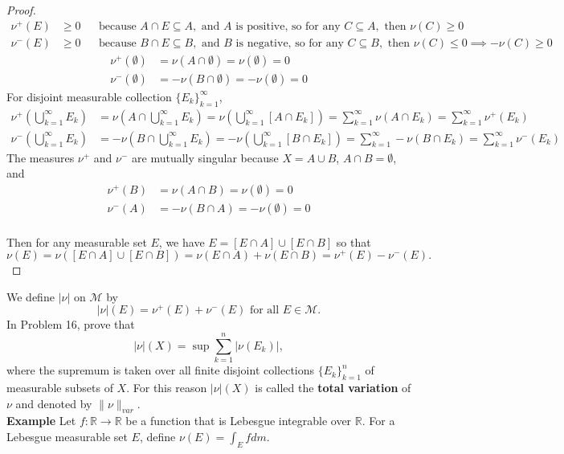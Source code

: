 \begin{flushleft}
\begin{proof}
			\begin{align*}
				\nu^+(E)&\ge0&&\text{because }A\cap E\subseteq A,\text{ and }A\text{ is positive, so for any }C\subseteq A,\text{ then }\nu(C)\ge0\\
				\nu^-(E)&\ge0&&\text{because }B\cap E\subseteq B,\text{ and }B\text{ is negative, so for any }C\subseteq B,\text{ then }\nu(C)\le0\implies-\nu(C)\ge0
			\end{align*}
			\begin{align*}
				\nu^+(\emptyset)&=\nu(A\cap\emptyset)=\nu(\emptyset)=0\\
				\nu^-(\emptyset)&=-\nu(B\cap\emptyset)=-\nu(\emptyset)=0
			\end{align*}
			For disjoint measurable collection $\{E_k\}_{k=1}^\infty$,
			\begin{align*}
				\nu^+(\bigcup_{k=1}^\infty E_k)&=\nu(A\cap\bigcup_{k=1}^\infty E_k)=\nu(\bigcup_{k=1}^\infty [A\cap E_k])=\sum_{k=1}^\infty\nu(A\cap E_k)=\sum_{k=1}^\infty\nu^+(E_k)\\
				\nu^-(\bigcup_{k=1}^\infty E_k)&=-\nu(B\cap\bigcup_{k=1}^\infty E_k)=-\nu(\bigcup_{k=1}^\infty [B\cap E_k])=\sum_{k=1}^\infty-\nu(B\cap E_k)=\sum_{k=1}^\infty\nu^-(E_k)
			\end{align*}
		The measures $\nu^+$ and $\nu^-$ are mutually singular because $X=A\cup B$, $A\cap B=\emptyset$, and 
		\begin{align*}
			\nu^+(B)&=\nu(A\cap B)=\nu(\emptyset)=0\\
			\nu^-(A)&=-\nu(B\cap A)=-\nu(\emptyset)=0
		\end{align*}
		\\Then for any measurable set $E$, we have $E=[E\cap A]\cup[E\cap B]$ so that 
		\[
			\nu(E)=\nu([E\cap A]\cup[E\cap B])=\nu(E\cap A)+\nu(E\cap B)=\nu^+(E)-\nu^-(E).
		\]
	\end{proof}
	We define $|\nu|$ on $\mathcal{M}$ by
	\[
		|\nu|(E)=\nu^+(E)+\nu^-(E)\text{ for all }E\in\mathcal{M}.
	\]
	In Problem 16, prove that 
	\begin{equation*}
		|\nu|(X)=\sup\sum_{k=1}^n|\nu(E_k)|,\tag{4}
	\end{equation*}
	where the supremum is taken over all finite disjoint collections $\{E_k\}_{k=1}^n$ of measurable subsets of $X$.
	For this reason $|\nu|(X)$ is called the \textbf{total variation} of $\nu$ and denoted by $\|\nu\|_{var}$.
	\\\bigskip
	\textbf{Example}
	Let $f:\mathbb{R}\to\mathbb{R}$ be a function that is Lebesgue integrable over $\mathbb{R}$.
	For a Lebesgue measurable set $E$, define $\nu(E)=\int_E f dm$.

\end{flushleft}
